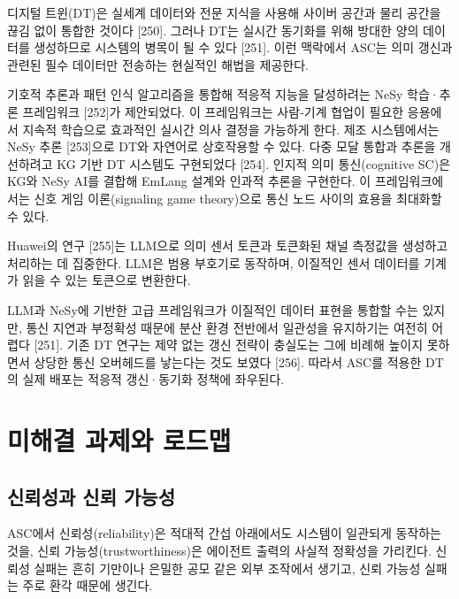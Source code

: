 디지털 트윈(DT)은 실세계 데이터와 전문 지식을 사용해 사이버 공간과 물리 공간을 끊김 없이 통합한 것이다 [250]. 그러나 DT는 실시간 동기화를 위해 방대한 양의 데이터를 생성하므로 시스템의 병목이 될 수 있다 [251]. 이런 맥락에서 ASC는 의미 갱신과 관련된 필수 데이터만 전송하는 현실적인 해법을 제공한다.

기호적 추론과 패턴 인식 알고리즘을 통합해 적응적 지능을 달성하려는 NeSy 학습·추론 프레임워크 [252]가 제안되었다. 이 프레임워크는 사람-기계 협업이 필요한 응용에서 지속적 학습으로 효과적인 실시간 의사 결정을 가능하게 한다. 제조 시스템에서는 NeSy 추론 [253]으로 DT와 자연어로 상호작용할 수 있다. 다중 모달 통합과 추론을 개선하려고 KG 기반 DT 시스템도 구현되었다 [254]. 인지적 의미 통신(cognitive SC)은 KG와 NeSy AI를 결합해 EmLang 설계와 인과적 추론을 구현한다. 이 프레임워크에서는 신호 게임 이론(signaling game theory)으로 통신 노드 사이의 효용을 최대화할 수 있다.

Huawei의 연구 [255]는 LLM으로 의미 센서 토큰과 토큰화된 채널 측정값을 생성하고 처리하는 데 집중한다. LLM은 범용 부호기로 동작하며, 이질적인 센서 데이터를 기계가 읽을 수 있는 토큰으로 변환한다.

LLM과 NeSy에 기반한 고급 프레임워크가 이질적인 데이터 표현을 통합할 수는 있지만, 통신 지연과 부정확성 때문에 분산 환경 전반에서 일관성을 유지하기는 여전히 어렵다 [251]. 기존 DT 연구는 제약 없는 갱신 전략이 충실도는 그에 비례해 높이지 못하면서 상당한 통신 오버헤드를 낳는다는 것도 보였다 [256]. 따라서 ASC를 적용한 DT의 실제 배포는 적응적 갱신·동기화 정책에 좌우된다.

\section{미해결 과제와 로드맵}

\subsection{신뢰성과 신뢰 가능성}

ASC에서 신뢰성(reliability)은 적대적 간섭 아래에서도 시스템이 일관되게 동작하는 것을, 신뢰 가능성(trustworthiness)은 에이전트 출력의 사실적 정확성을 가리킨다. 신뢰성 실패는 흔히 기만이나 은밀한 공모 같은 외부 조작에서 생기고, 신뢰 가능성 실패는 주로 환각 때문에 생긴다.

